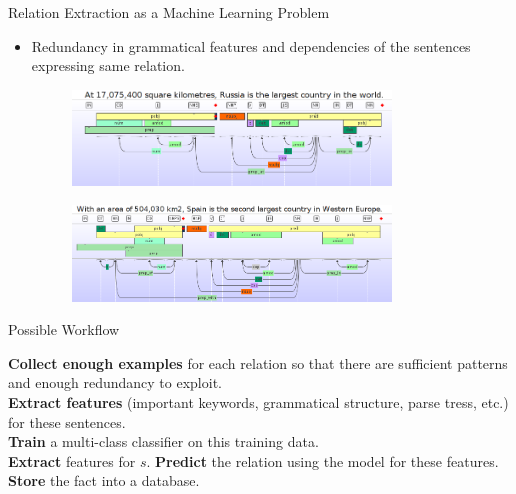 \documentclass{beamer}
\begin{document}
\begin{frame}{Relation Extraction as a Machine Learning Problem}
 
 \begin{itemize}
  \item Redundancy in grammatical features and dependencies of the sentences expressing same relation. \pause 
     \begin{figure}
    \centering
    \includegraphics[width = 0.8\textwidth]{images/ex_4}
  \end{figure} \pause
  
   \begin{figure}
    \centering
    \includegraphics[width = 0.8\textwidth]{images/ex_5}
  \end{figure}
 \end{itemize}

\end{frame}



\begin{frame}{Possible Workflow}
\begin{algorithm}[H]
\begin{algorithmic}[1]
\STATE \textbf{Collect enough examples} for each relation so that there are sufficient patterns and enough redundancy to exploit. \\
\STATE \textbf{Extract features} (important keywords, grammatical structure, parse tress, etc.) for these sentences. \\
\STATE \textbf{Train} a multi-class classifier on this training data. \\
\STATE \textbf{Extract} features for $s$.
\STATE \textbf{Predict} the relation using the model for these features.
\STATE \textbf{Store} the fact into a database.
\ENDFOR

\end{algorithmic}
\caption*{Relation Extraction}
\label{alg:seq}
\end{algorithm}
\end{frame}
\end{document}
